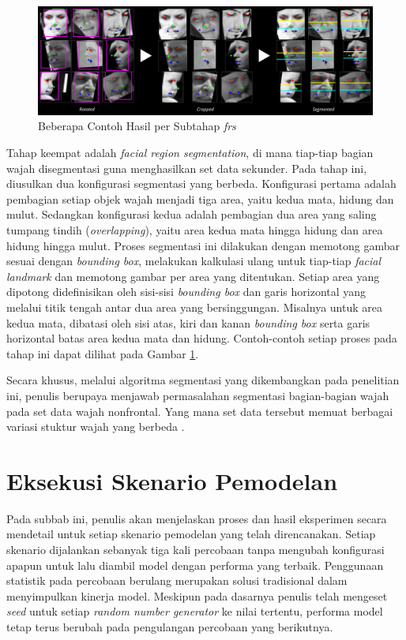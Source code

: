 \begin{figure}
    \centering
    \includegraphics[width=14cm]{gambar/proses_facial_region_segmentation.png}
    \caption{Beberapa Contoh Hasil per Subtahap \textit{\acrlong{frs}}}
    \label{fig:prosesfacialregionsegmentation}
\end{figure}
Tahap keempat adalah \textit{facial region segmentation}, di mana tiap-tiap bagian wajah disegmentasi guna menghasilkan set data sekunder. Pada tahap ini, diusulkan dua konfigurasi segmentasi yang berbeda. Konfigurasi pertama adalah pembagian setiap objek wajah menjadi tiga area, yaitu kedua mata, hidung dan mulut. Sedangkan konfigurasi kedua adalah pembagian dua area yang saling tumpang tindih (\textit{overlapping}), yaitu area kedua mata hingga hidung dan area hidung hingga mulut. Proses segmentasi ini dilakukan dengan memotong gambar sesuai dengan \textit{bounding box}, melakukan kalkulasi ulang untuk tiap-tiap \textit{facial landmark} dan memotong gambar per area yang ditentukan. Setiap area yang dipotong didefinisikan oleh sisi-sisi \textit{bounding box} dan garis horizontal yang melalui titik tengah antar dua area yang bersinggungan. Misalnya untuk area kedua mata, dibatasi oleh sisi atas, kiri dan kanan \textit{bounding box} serta garis horizontal batas area kedua mata dan hidung. Contoh-contoh setiap proses pada tahap ini dapat dilihat pada Gambar \ref{fig:prosesfacialregionsegmentation}.

Secara khusus, melalui algoritma segmentasi yang dikembangkan pada penelitian ini, penulis berupaya menjawab permasalahan segmentasi bagian-bagian wajah pada set data wajah nonfrontal. Yang mana set data tersebut memuat berbagai variasi stuktur wajah yang berbeda .

\section{Eksekusi Skenario Pemodelan}
Pada subbab ini, penulis akan menjelaskan proses dan hasil eksperimen secara mendetail untuk setiap skenario pemodelan yang telah direncanakan. Setiap skenario dijalankan sebanyak tiga kali percobaan tanpa mengubah konfigurasi apapun untuk lalu diambil model dengan performa yang terbaik. Penggunaan statistik pada percobaan berulang merupakan solusi tradisional dalam menyimpulkan kinerja model. Meskipun pada dasarnya penulis telah mengeset \textit{seed} untuk setiap \textit{random number generator} ke nilai tertentu, performa model tetap terus berubah pada pengulangan percobaan yang berikutnya.

